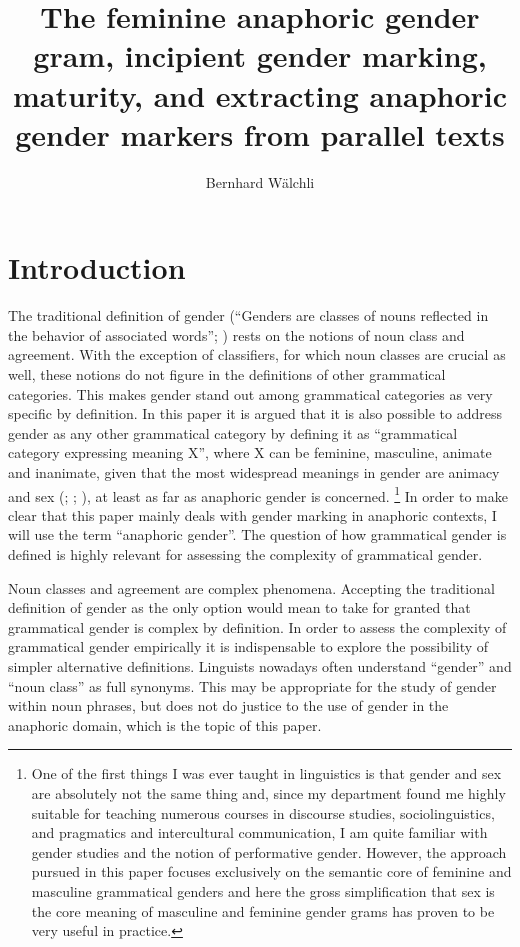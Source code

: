\documentclass[output=collectionpaper]{langsci/langscibook}
\title{The feminine anaphoric gender gram, incipient gender marking, maturity, and extracting anaphoric gender markers from parallel texts}
\author{%
Bernhard Wälchli
\affiliation{Stockholm University}%
}%
\begin{document}
\section{Introduction}
\label{sec:BW:1}

The traditional definition of gender (“Genders are classes of nouns reflected in the behavior of associated words”; \citealt[231]{Hockett1958}) rests on the notions of noun class and agreement. With the exception of classifiers, for which noun classes are crucial as well, these notions do not figure in the definitions of other grammatical categories. This makes gender stand out among grammatical categories as very specific by definition. In this paper it is argued that it is also possible to address gender as any other grammatical category by defining it as “grammatical category expressing meaning X”, where X can be feminine, masculine, animate and inanimate, given that the most widespread meanings in gender are animacy and sex (\citealt[101]{Dahl2000a}; \citealt[68]{Corbett1991}; \citealt{Luraghi2011}), at least as far as anaphoric gender is concerned.%
\footnote{%
One of the first things I was ever taught in linguistics is that gender and sex are absolutely not the same thing and, since my department found me highly suitable for teaching numerous courses in discourse studies, sociolinguistics, and pragmatics and intercultural communication, I am quite familiar with gender studies and the notion of performative gender. However, the approach pursued in this paper focuses exclusively on the semantic core of feminine and masculine grammatical genders and here the gross simplification that sex is the core meaning of masculine and feminine gender grams has proven to be very useful in practice.
} %
In order to make clear that this paper mainly deals with gender marking in anaphoric contexts, I will use the term “anaphoric gender”. The question of how grammatical gender is defined is highly relevant for assessing the complexity of grammatical gender.

Noun classes and agreement are complex phenomena. Accepting the traditional definition of gender as the only option would mean to take for granted that grammatical gender is complex by definition. In order to assess the complexity of grammatical gender empirically it is indispensable to explore the possibility of simpler alternative definitions. Linguists nowadays often understand “gender” and “noun class” as full synonyms. This may be appropriate for the study of gender within noun phrases, but does not do justice to the use of gender in the anaphoric domain, which is the topic of this paper.
\end{document}
